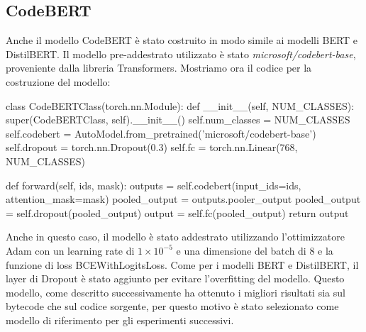 \documentclass[../../Thesis.tex]{subfiles}
\begin{document}
\subsection{CodeBERT}
Anche il modello CodeBERT \`e stato costruito in modo simile ai modelli BERT e DistilBERT. Il modello pre-addestrato utilizzato \`e stato \textit{microsoft/codebert-base}, proveniente dalla libreria Transformers. Mostriamo ora il codice per la costruzione del modello:
\begin{python}
    class CodeBERTClass(torch.nn.Module):
        def __init__(self, NUM_CLASSES):
            super(CodeBERTClass, self).__init__()
            self.num_classes = NUM_CLASSES
            self.codebert = AutoModel.from_pretrained('microsoft/codebert-base')
            self.dropout = torch.nn.Dropout(0.3)
            self.fc = torch.nn.Linear(768, NUM_CLASSES)
        
        def forward(self, ids, mask):
            outputs = self.codebert(input_ids=ids, attention_mask=mask)
            pooled_output = outputs.pooler_output
            pooled_output = self.dropout(pooled_output)
            output = self.fc(pooled_output)
            return output
\end{python}
Anche in questo caso, il modello \`e stato addestrato utilizzando l'ottimizzatore Adam con un learning rate di $1 \times 10^{-5}$ e una dimensione del batch di 8 e la funzione di loss BCEWithLogitsLoss. Come per i modelli BERT e DistilBERT, il layer di Dropout \`e stato aggiunto per evitare l'overfitting del modello. Questo modello, come descritto successivamente ha ottenuto i migliori risultati sia sul bytecode che sul codice sorgente, per questo motivo \`e stato selezionato come modello di riferimento per gli esperimenti successivi.
\end{document}
